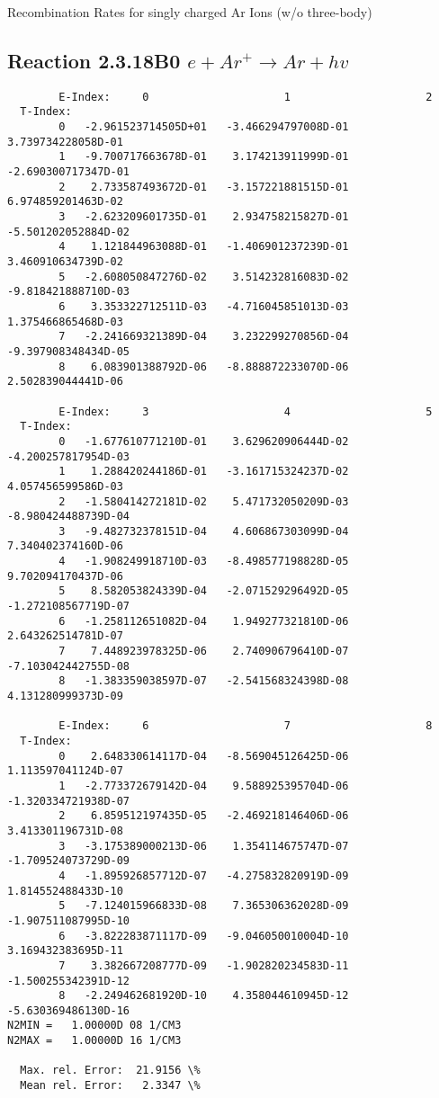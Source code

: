 \documentclass[12pt,dvipdfmx]{article}
\begin{document}
  Recombination Rates for singly charged Ar Ions (w/o three-body)
\subsection{
Reaction 2.3.18B0  $  e + Ar^+ \rightarrow  Ar + hv $
}


\begin{small}\begin{verbatim}
        E-Index:     0                     1                     2
  T-Index:
        0   -2.961523714505D+01   -3.466294797008D-01    3.739734228058D-01
        1   -9.700717663678D-01    3.174213911999D-01   -2.690300717347D-01
        2    2.733587493672D-01   -3.157221881515D-01    6.974859201463D-02
        3   -2.623209601735D-01    2.934758215827D-01   -5.501202052884D-02
        4    1.121844963088D-01   -1.406901237239D-01    3.460910634739D-02
        5   -2.608050847276D-02    3.514232816083D-02   -9.818421888710D-03
        6    3.353322712511D-03   -4.716045851013D-03    1.375466865468D-03
        7   -2.241669321389D-04    3.232299270856D-04   -9.397908348434D-05
        8    6.083901388792D-06   -8.888872233070D-06    2.502839044441D-06

        E-Index:     3                     4                     5
  T-Index:
        0   -1.677610771210D-01    3.629620906444D-02   -4.200257817954D-03
        1    1.288420244186D-01   -3.161715324237D-02    4.057456599586D-03
        2   -1.580414272181D-02    5.471732050209D-03   -8.980424488739D-04
        3   -9.482732378151D-04    4.606867303099D-04    7.340402374160D-06
        4   -1.908249918710D-03   -8.498577198828D-05    9.702094170437D-06
        5    8.582053824339D-04   -2.071529296492D-05   -1.272108567719D-07
        6   -1.258112651082D-04    1.949277321810D-06    2.643262514781D-07
        7    7.448923978325D-06    2.740906796410D-07   -7.103042442755D-08
        8   -1.383359038597D-07   -2.541568324398D-08    4.131280999373D-09

        E-Index:     6                     7                     8
  T-Index:
        0    2.648330614117D-04   -8.569045126425D-06    1.113597041124D-07
        1   -2.773372679142D-04    9.588925395704D-06   -1.320334721938D-07
        2    6.859512197435D-05   -2.469218146406D-06    3.413301196731D-08
        3   -3.175389000213D-06    1.354114675747D-07   -1.709524073729D-09
        4   -1.895926857712D-07   -4.275832820919D-09    1.814552488433D-10
        5   -7.124015966833D-08    7.365306362028D-09   -1.907511087995D-10
        6   -3.822283871117D-09   -9.046050010004D-10    3.169432383695D-11
        7    3.382667208777D-09   -1.902820234583D-11   -1.500255342391D-12
        8   -2.249462681920D-10    4.358044610945D-12   -5.630369486130D-16
N2MIN =   1.00000D 08 1/CM3
N2MAX =   1.00000D 16 1/CM3

  Max. rel. Error:  21.9156 \%
  Mean rel. Error:   2.3347 \%

\end{verbatim}\end{small}
\end{document}
